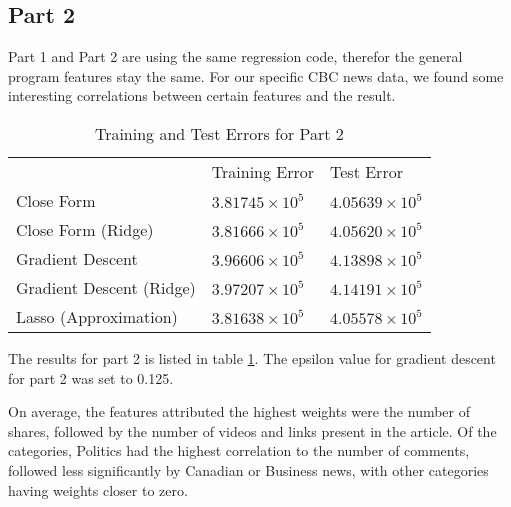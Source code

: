 \documentclass[conference,compsoc]{IEEEtran}
\begin{document}
\subsection{Part 2}

Part 1 and Part 2 are using the same regression code, therefor the general program features stay the same. For our specific CBC news data, we found some interesting correlations between certain features and the result. 

\begin{table}[]
	\centering
	\caption{Training and Test Errors for Part 2}\label{table:part2results}
	\begin{tabular}{lll}
		& Training Error                            & Test Error           \\
		Close Form                & $3.81745 \times 10^5$ & $4.05639 \times 10^5$ \\
		Close Form (Ridge)        & $3.81666 \times 10^5$ & $4.05620 \times 10^5$ \\
		Gradient Descent          & $3.96606 \times 10^5$ & $4.13898 \times 10^5$ \\
		Gradient Descent (Ridge)  & $3.97207 \times 10^5$ & $4.14191 \times 10^5$ \\
		Lasso (Approximation)     & $3.81638 \times 10^5$ & $4.05578 \times 10^5$  \\       
	\end{tabular}
\end{table}

The results for part 2 is listed in table \ref{table:part2results}. The epsilon value for gradient descent for part 2 was set to 0.125.

On average, the features attributed the highest weights were the number of shares, followed by the number of videos and links present in the article. Of the categories, Politics had the highest correlation to the number of comments, followed less significantly by Canadian or Business news, with other categories having weights closer to zero.

%
%
\end{document}
